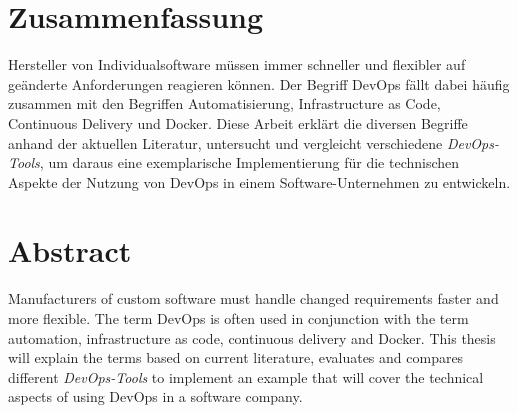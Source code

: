 \section*{Zusammenfassung}

Hersteller von Individualsoftware müssen immer schneller und flexibler auf geänderte Anforderungen reagieren können.
Der Begriff DevOps fällt dabei häufig zusammen mit den Begriffen Automatisierung, Infrastructure as Code,
Continuous Delivery und Docker.
Diese Arbeit erklärt die diversen Begriffe anhand der aktuellen Literatur,
untersucht und vergleicht verschiedene \textsl{DevOps-Tools},
um daraus eine exemplarische Implementierung für die technischen Aspekte der Nutzung von DevOps in einem
Software-Unternehmen zu entwickeln.

\section*{Abstract}

Manufacturers of custom software must handle changed requirements faster and more flexible.
The term DevOps is often used in conjunction with the term automation, infrastructure as code, continuous delivery
and Docker.
This thesis will explain the terms based on current literature,
evaluates and compares different \textsl{DevOps-Tools}
to implement an example that will cover the technical aspects of using DevOps in a software company.

